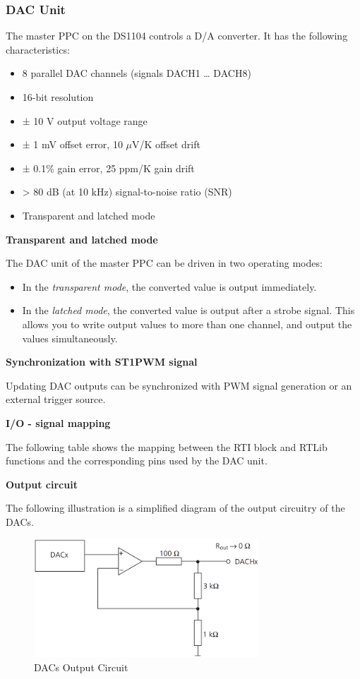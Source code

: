 \subsubsection{DAC Unit}
The master PPC on the DS1104 controls a D/A converter. It has the following characteristics:
\begin{itemize}
    \item 8 parallel DAC channels (signals DACH1 … DACH8)
    \item 16-bit resolution
    \item ± 10 V output voltage range
    \item ± 1 mV offset error, 10 $\mu$V/K offset drift
    \item ± 0.1\% gain error, 25 ppm/K gain drift
    \item > 80 dB (at 10 kHz) signal-to-noise ratio (SNR)
    \item Transparent and latched mode
\end{itemize}
\textbf{Transparent and latched mode}\par
The DAC unit of the master PPC can be driven in two operating modes:
\begin{itemize}
    \item In the \textit{transparent mode}, the converted value is output immediately.
    \item In the \textit{latched mode}, the converted value is output after a strobe signal. This allows you to write output values to more than one channel, and output the values simultaneously.
\end{itemize}

\noindent \textbf{Synchronization with ST1PWM signal}\par
Updating DAC outputs can be synchronized with PWM signal generation or an external trigger source. 

\noindent \textbf{I/O - signal mapping}\par
The following table shows the mapping between the RTI block and RTLib functions and the corresponding pins used by the DAC unit.



\noindent \textbf{Output circuit}\par
The following illustration is a simplified diagram of the output circuitry of the DACs.
\begin{figure}[H]
    \centering
    \includegraphics[width=0.75\textwidth]{Images/DACx.png}
    \caption{DACs Output Circuit}
    \label{DACs}
\end{figure}

